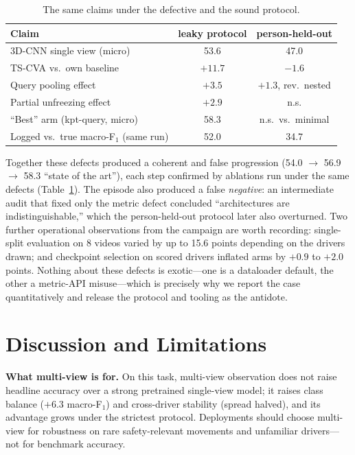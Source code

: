 \documentclass[journal]{IEEEtran}
\newcommand{\mF}{macro-F$_1$}
\begin{document}
\begin{table}[t]
\caption{The same claims under the defective and the sound protocol.}
\label{tab:leaky}
\centering\footnotesize\setlength{\tabcolsep}{3.5pt}
\begin{tabular}{lcc}
\toprule
Claim & leaky protocol & person-held-out \\
\midrule
3D-CNN single view (micro)        & 53.6 & 47.0 \\
TS-CVA vs.\ own baseline          & $+11.7$ & $-1.6$ \\
Query pooling effect              & $+3.5$ & $+1.3$, rev.\ nested \\
Partial unfreezing effect         & $+2.9$ & n.s. \\
``Best'' arm (kpt-query, micro)   & 58.3 & n.s.\ vs.\ minimal \\
Logged vs.\ true \mF{} (same run) & 52.0 & 34.7 \\
\bottomrule
\end{tabular}
\end{table}

Together these defects produced a coherent and false progression
(54.0 $\rightarrow$ 56.9 $\rightarrow$ 58.3 ``state of the art''), each
step confirmed by ablations run under the same defects
(Table~\ref{tab:leaky}).  The episode also produced a false \emph{negative}:
an intermediate audit that fixed only the metric defect concluded
``architectures are indistinguishable,'' which the person-held-out protocol
later also overturned.  Two further operational observations from the
campaign are worth recording: single-split evaluation on 8 videos varied by
up to 15.6 points depending on the drivers drawn; and checkpoint selection
on scored drivers inflated arms by $+0.9$ to $+2.0$ points.  Nothing about
these defects is exotic---one is a dataloader default, the other a
metric-API misuse---which is precisely why we report the case
quantitatively and release the protocol and tooling as the antidote.

\section{Discussion and Limitations}
\label{sec:discussion}
\textbf{What multi-view is for.}  On this task, multi-view observation does
not raise headline accuracy over a strong pretrained single-view model; it
raises class balance ($+6.3$ \mF) and cross-driver stability (spread
halved), and its advantage grows under the strictest protocol.  Deployments
should choose multi-view for robustness on rare safety-relevant movements
and unfamiliar drivers---not for benchmark accuracy.
\end{document}
